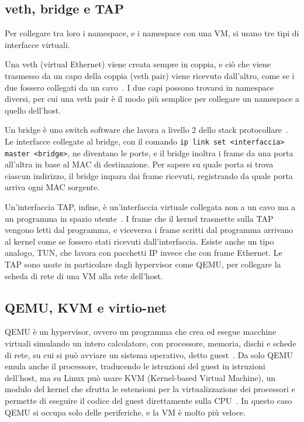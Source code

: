 \subsection{veth, bridge e TAP}

Per collegare tra loro i namespace, e i namespace con una VM, si usano tre tipi di interfacce virtuali.

Una veth (virtual Ethernet) viene creata sempre in coppia, e ciò che viene trasmesso da un capo della coppia (veth pair) viene ricevuto dall'altro, come se i due fossero collegati da un cavo~\cite{man-veth}. I due capi possono trovarsi in namespace diversi, per cui una veth pair è il modo più semplice per collegare un namespace a quello dell'host.

Un bridge è uno switch software che lavora a livello 2 dello stack protocollare~\cite{kernel-bridge}. Le interfacce collegate al bridge, con il comando \texttt{ip link set <interfaccia> master <bridge>}, ne diventano le porte, e il bridge inoltra i frame da una porta all'altra in base al MAC di destinazione. Per sapere su quale porta si trova ciascun indirizzo, il bridge impara dai frame ricevuti, registrando da quale porta arriva ogni MAC sorgente.

Un'interfaccia TAP, infine, è un'interfaccia virtuale collegata non a un cavo ma a un programma in spazio utente~\cite{kernel-tuntap}. I frame che il kernel trasmette sulla TAP vengono letti dal programma, e viceversa i frame scritti dal programma arrivano al kernel come se fossero stati ricevuti dall'interfaccia. Esiste anche un tipo analogo, TUN, che lavora con pacchetti IP invece che con frame Ethernet. Le TAP sono usate in particolare dagli hypervisor come QEMU, per collegare la scheda di rete di una VM alla rete dell'host.

\subsection{QEMU, KVM e virtio-net}

QEMU è un hypervisor, ovvero un programma che crea ed esegue macchine virtuali simulando un intero calcolatore, con processore, memoria, dischi e schede di rete, su cui si può avviare un sistema operativo, detto guest~\cite{qemu-about}. Da solo QEMU emula anche il processore, traducendo le istruzioni del guest in istruzioni dell'host, ma su Linux può usare KVM (Kernel-based Virtual Machine), un modulo del kernel che sfrutta le estensioni per la virtualizzazione dei processori e permette di eseguire il codice del guest direttamente sulla CPU~\cite{kvm}. In questo caso QEMU si occupa solo delle periferiche, e la VM è molto più veloce.

